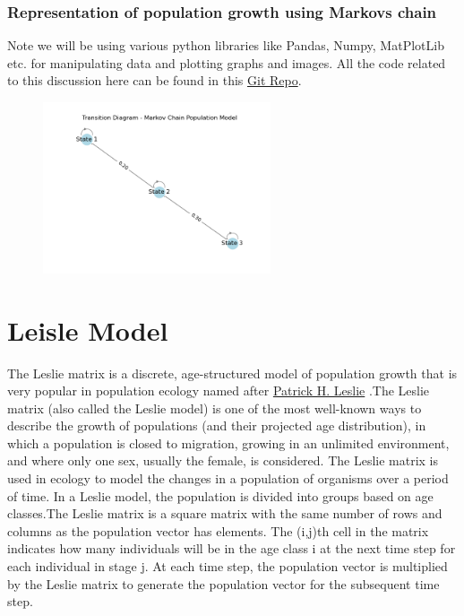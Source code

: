 \documentclass[12pt]{article}
\begin{document}
\subsubsection{Representation of population growth using Markovs chain}
Note we will be using various python libraries like Pandas, Numpy, MatPlotLib etc. for manipulating data and plotting graphs and images. All the code related to this discussion here can be found in this \href{https://github.com/ABiiitH/LA_Project_Population.git}{Git Repo}.
\begin{figure}[H]
  \centering
  \includegraphics[width=0.6\textwidth]{Figure_2.png}
\end{figure}

\section{Leisle Model}
The Leslie matrix is a discrete, age-structured model of population growth that is very popular in population ecology named after \href{https://en.wikipedia.org/wiki/Patrick_Holt_Leslie}{Patrick H. Leslie} .The Leslie matrix (also called the Leslie model) is one of the most well-known ways to describe the growth of populations (and their projected age distribution), in which a population is closed to migration, growing in an unlimited environment, and where only one sex, usually the female, is considered. The Leslie matrix is used in ecology to model the changes in a population of organisms over a period of time. In a Leslie model, the population is divided into groups based on age classes.The Leslie matrix is a square matrix with the same number of rows and columns as the population vector has elements. The (i,j)th cell in the matrix indicates how many individuals will be in the age class i at the next time step for each individual in stage j. At each time step, the population vector is multiplied by the Leslie matrix to generate the population vector for the subsequent time step.
\end{document}
